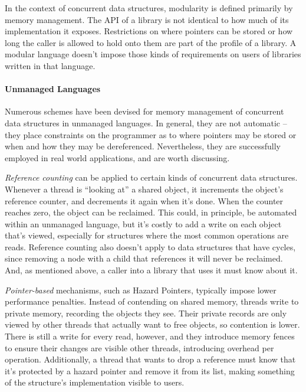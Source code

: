 In the context of concurrent data structures, modularity is defined primarily by memory management.  The API of a library is not identical to how much of its implementation it exposes.  Restrictions on where pointers can be stored or how long the caller is allowed to hold onto them are part of the profile of a library.  A modular language doesn't impose those kinds of requirements on users of libraries written in that language.

\paragraph{Unmanaged Languages} Numerous schemes have been devised for memory management of concurrent data structures in unmanaged languages.  In general, they are not automatic -- they place constraints on the programmer as to where pointers may be stored or when and how they may be dereferenced.  Nevertheless, they are successfully employed in real world applications, and are worth discussing.

\textit{Reference counting} can be applied to certain kinds of concurrent data structures\cite{DMMS, GPST09}.  Whenever a thread is ``looking at'' a shared object, it increments the object's reference counter, and decrements it again when it's done.  When the counter reaches zero, the object can be reclaimed.  This could, in principle, be automated within an unmanaged language, but it's costly to add a write on each object that's viewed, especially for structures where the most common operations are reads.  Reference counting also doesn't apply to data structures that have cycles, since removing a node with a child that references it will never be reclaimed.  And, as mentioned above, a caller into a library that uses it must know about it.

\textit{Pointer-based} mechanisms, such as Hazard Pointers\cite{HP, DTA, PassTheBuck}, typically impose lower performance penalties.  Instead of contending on shared memory, threads write to private memory, recording the objects they see.  Their private records are only viewed by other threads that actually want to free objects, so contention is lower.  There is still a write for every read, however, and they introduce memory fences to ensure their changes are visible other threads, introducing overhead per operation.  Additionally, a thread that wants to drop a reference must know that it's protected by a hazard pointer and remove it from its list, making something of the structure's implementation visible to users.

